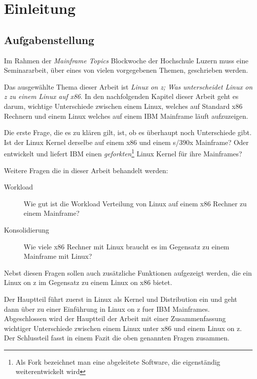 \chapter{Einleitung}
\label{cha:Einleitung}

\section{Aufgabenstellung}

Im Rahmen der \textit{Mainframe Topics} Blockwoche der Hochschule Luzern muss eine Seminararbeit,
über eines von vielen vorgegebenen Themen, geschrieben werden.

Das ausgewählte Thema dieser Arbeit ist \textit{Linux on z; Was unterscheidet Linux on z zu einem Linux auf x86}.
In den nachfolgenden Kapitel dieser Arbeit geht es darum, wichtige Unterschiede zwischen einem Linux, welches auf Standard x86 Rechnern und einem Linux welches auf einem IBM Mainframe läuft aufzuzeigen.

Die erste Frage, die es zu klären gilt, ist, ob es überhaupt noch Unterschiede gibt. Ist der Linux Kernel derselbe auf einem x86 und einem s/390x Mainframe? Oder entwickelt und liefert IBM einen \textit{geforkten}\footnote{Als Fork bezeichnet man eine abgeleitete Software, die eigenständig weiterentwickelt wird} Linux Kernel für ihre Mainframes?

Weitere Fragen die in dieser Arbeit behandelt werden:
\begin{description}
    \item[Workload]{Wie gut ist die Workload Verteilung von Linux auf einem x86 Rechner zu einem Mainframe?}
    \item[Konsolidierung]{Wie viele x86 Rechner mit Linux braucht es im Gegensatz zu einem Mainframe mit Linux?}
\end{description}

Nebst diesen Fragen sollen auch zusätzliche Funktionen aufgezeigt werden, die ein Linux on z im Gegensatz zu einem Linux on x86 bietet.

Der Hauptteil führt zuerst in Linux als Kernel und Distribution ein und geht dann über zu einer Einführung in Linux on z fuer IBM Mainframes.
Abgeschlossen wird der Hauptteil der Arbeit mit einer Zusammenfassung wichtiger Unterschiede zwischen einem Linux unter x86 und einem Linux on z.
Der Schlussteil fasst in einem Fazit die oben genannten Fragen zusammen.
